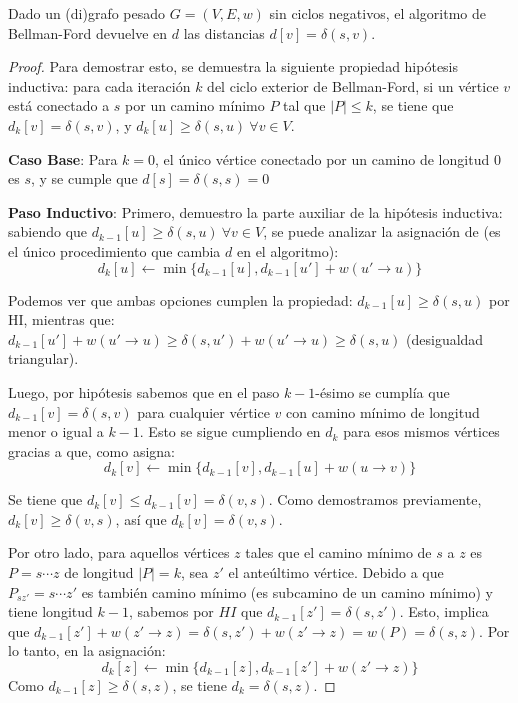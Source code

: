 \begin{theorem*}
    Dado un (di)grafo pesado $G = (V, E, w)$ sin ciclos negativos, el algoritmo de Bellman-Ford devuelve en $d$ las distancias $d[v] = \delta(s, v)$.
\end{theorem*}
\begin{proof}
    Para demostrar esto, se demuestra la siguiente propiedad hipótesis inductiva: para cada iteración $k$ del ciclo exterior de Bellman-Ford, si un vértice $v$ está conectado a $s$ por un camino mínimo $P$ tal que $|P| \leq k$, se tiene que $d_{k}[v] = \delta(s, v)$, y $d_k[u] \geq \delta(s, u)\ \forall v \in V$.

    \textbf{Caso Base}: Para $k = 0$, el único vértice conectado por un camino de longitud $0$ es $s$, y se cumple que $d[s] = \delta(s, s) = 0$

    \textbf{Paso Inductivo}: Primero, demuestro la parte auxiliar de la hipótesis inductiva: sabiendo que $d_{k - 1}[u] \geq \delta(s, u)\ \forall v \in V$, se puede analizar la asignación de  (es el único procedimiento que cambia $d$ en el algoritmo):
    $$d_k[u] \gets \min{\{d_{k - 1}[u], d_{k - 1}[u'] + w(u' \rightarrow u)\}}$$

    Podemos ver que ambas opciones cumplen la propiedad: $d_{k - 1}[u] \geq \delta(s, u)$ por HI, mientras que: $d_{k - 1}[u'] + w(u' \rightarrow u) \geq \delta(s, u') + w(u' \rightarrow u) \geq \delta(s, u)$ (desigualdad triangular).

    Luego, por hipótesis sabemos que en el paso $k - 1$-ésimo se cumplía que $d_{k - 1}[v] = \delta(s, v)$ para cualquier vértice $v$ con camino mínimo de longitud menor o igual a $k - 1$. Esto se sigue cumpliendo en $d_k$ para esos mismos vértices gracias a que, como  asigna:
    $$d_k[v] \gets \min{\{d_{k - 1}[v], d_{k - 1}[u] + w(u \rightarrow v)\}}$$

    Se tiene que $d_k[v] \leq d_{k - 1}[v] = \delta(v, s)$. Como demostramos previamente, $d_k[v] \geq \delta(v, s)$, así que $d_k[v] = \delta(v, s)$.

    Por otro lado, para aquellos vértices $z$ tales que el camino mínimo de $s$ a $z$ es $P = s \cdots z$ de longitud $|P| = k$, sea $z'$ el anteúltimo vértice. Debido a que $P_{sz'} = s \cdots z'$ es también camino mínimo (es subcamino de un camino mínimo) y tiene longitud $k - 1$, sabemos por $HI$ que $d_{k - 1}[z'] = \delta(s, z')$. Esto, implica que $d_{k - 1}[z'] + w(z' \rightarrow z) = \delta(s, z') + w(z' \rightarrow z) = w(P) = \delta(s, z)$. Por lo tanto, en la asignación:
    $$d_k[z] \gets \min{\{d_{k - 1}[z], d_{k - 1}[z'] + w(z' \rightarrow z)\}}$$
    Como $d_{k - 1}[z] \geq \delta(s, z)$, se tiene $d_k = \delta(s, z)$.


\end{proof}
